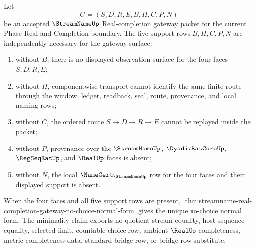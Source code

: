 \begin{theorem}
\label{thm:streamname-real-completion-gateway-support-row-minimality}
Let
$$
G=(S,D,R,E,B,H,C,P,N)
$$
be an accepted $\StreamNameUp$ Real-completion gateway packet for the current Phase Real and Completion boundary. The five support rows $B,H,C,P,N$ are independently necessary for the gateway surface:
\begin{enumerate}
\item without $B$, there is no displayed observation surface for the four faces $S,D,R,E$;
\item without $H$, componentwise transport cannot identify the same finite route through the window, ledger, readback, seal, route, provenance, and local naming rows;
\item without $C$, the ordered route $S \longrightarrow D \longrightarrow R \longrightarrow E$ cannot be replayed inside the packet;
\item without $P$, provenance over the $\StreamNameUp$, $\DyadicRatCoreUp$, $\RegSeqRatUp$, and $\RealUp$ faces is absent;
\item without $N$, the local $\NameCert_{\StreamNameUp}$ row for the four faces and their displayed support is absent.
\end{enumerate}
When the four faces and all five support rows are present, \autoref{thm:streamname-real-completion-gateway-no-choice-normal-form} gives the unique no-choice normal form. The minimality claim exports no quotient stream equality, host sequence equality, selected limit, countable-choice row, ambient $\RealUp$ completeness, metric-completeness data, standard bridge row, or bridge-row substitute.
\end{theorem}
